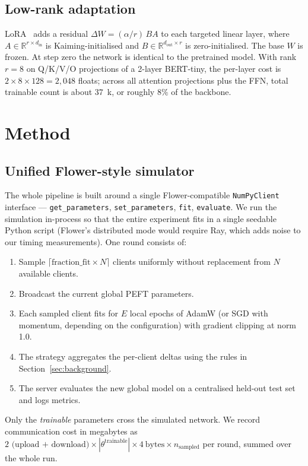 \documentclass[journal]{IEEEtran}
\begin{document}
\subsection{Low-rank adaptation}
LoRA~\cite{hu2022} adds a residual $\Delta W = (\alpha / r) \, B A$ to each
targeted linear layer, where $A \in \mathbb{R}^{r \times d_{\text{in}}}$ is
Kaiming-initialised and $B \in \mathbb{R}^{d_{\text{out}} \times r}$ is
zero-initialised. The base $W$ is frozen. At step zero the network is
identical to the pretrained model. With rank $r=8$ on Q/K/V/O projections
of a 2-layer BERT-tiny, the per-layer cost is $2 \times 8 \times 128 =
2{,}048$ floats; across all attention projections plus the FFN, total
trainable count is about $37$~k, or roughly $8\%$ of the backbone.


\section{Method}
\label{sec:method}

\subsection{Unified Flower-style simulator}
The whole pipeline is built around a single Flower-compatible
\texttt{NumPyClient} interface --- \texttt{get\_parameters},
\texttt{set\_parameters}, \texttt{fit}, \texttt{evaluate}. We run the
simulation in-process so that the entire experiment fits in a single
seedable Python script (Flower's distributed mode would require Ray, which
adds noise to our timing measurements). One round consists of:
\begin{enumerate}
  \item Sample $\lceil \text{fraction\_fit} \times N \rceil$ clients
        uniformly without replacement from $N$ available clients.
  \item Broadcast the current global PEFT parameters.
  \item Each sampled client fits for $E$ local epochs of AdamW (or SGD
        with momentum, depending on the configuration) with gradient
        clipping at norm 1.0.
  \item The strategy aggregates the per-client deltas using the rules in
        Section~\ref{sec:background}.
  \item The server evaluates the new global model on a centralised
        held-out test set and logs metrics.
\end{enumerate}
Only the \emph{trainable} parameters cross the simulated network. We
record communication cost in megabytes as
$\text{2 (upload + download)} \times |\theta^{\text{trainable}}| \times 4
~\text{bytes} \times n_{\text{sampled}}$
per round, summed over the whole run.
\end{document}
